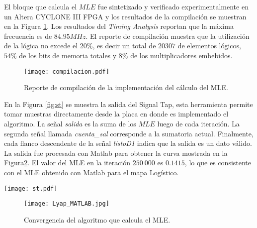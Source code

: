 El bloque que calcula el $MLE$ fue sintetizado y verificado experimentalmente en un Altera CYCLONE III FPGA y los resultados de la compilación se muestran en la Figura \ref{fig:compilacion}.
Los resultados del \textit{Timing Analysis} reportan que la máxima frecuencia es de $84.95MHz$.
El reporte de compilación muestra que la utilización de la lógica no excede el $20\%$, es decir un total de $20307$ de elementos lógicos, $54\%$ de los bits de memoria totales y $8\%$ de los multiplicadores embebidos.
%
\begin{figure}
	\centering
	\texttt{[image: compilacion.pdf]}\\
	\caption{Reporte de compilación de la implementación del cálculo del MLE.}\label{fig:compilacion}
\end{figure}

En la Figura \ref{fig:st} se muestra la salida del Signal Tap, esta herramienta permite tomar muestras directamente desde la placa en donde es implementado el algoritmo.
La señal \textit{salida} es la suma de los $MLE$ luego de cada iteración.
La segunda señal llamada \textit{cuenta\_sal} corresponde a la sumatoria actual.
Finalmente, cada flanco descendente de la señal \textit{listoD1} indica que la salida es un dato válido.
La salida fue procesada con Matlab para obtener la curva mostrada en la Figura\ref{fig:lyapu}.
El valor del MLE en la iteración $250~000$ es $0.1415$, lo que es consistente con el MLE obtenido con Matlab para el mapa Logístico.
%
\begin{figure*}
	\centering
	\texttt{[image: st.pdf]}\\
	\caption{Salida del Signal Tap.}\label{fig:st}
\end{figure*}
%
\begin{figure}
	\centering
	\texttt{[image: Lyap\_MATLAB.jpg]}\\
	\caption{Convergencia del algoritmo que calcula el MLE.}\label{fig:lyapu}
\end{figure}